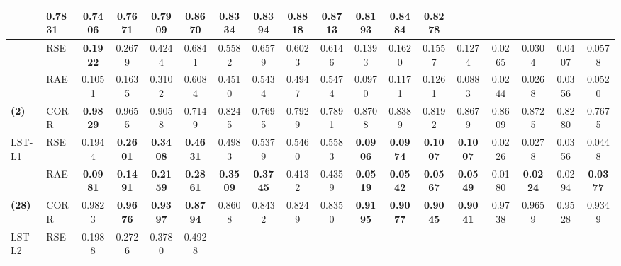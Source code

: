 \begin{table*}[!ht]
{\begin{tabular}{ll|cccc|cccc|cccc|cccc}
                          & 0.7831 & 0.7406 & 0.7671 & 0.7909
                          & 0.8670 & 0.8334 & 0.8394 & 0.8818
                          & 0.8713 & 0.8193 & 0.8484 & 0.8278\\
\midrule
{\multirow{2}{*}{VARMLP}} & RSE 
						 	   &\textbf{0.1922} & 0.2679 & 0.4244 & 0.6841 
                               & 0.5582 & 0.6579 & 0.6023 & 0.6146 
                               & 0.1393 & 0.1620 & 0.1557 & 0.1274
                               & 0.0265 & 0.0304 & 0.0407 & 0.0578\\
                     	& RAE  
                        	   & 0.1051 & 0.1635 & 0.3102 & 0.6084 
                               & 0.4510 & 0.5434 & 0.4947 & 0.5474
                               & 0.0970 & 0.1171 & 0.1261 & 0.0883
                               & 0.0244 & 0.0268 & 0.0356 & 0.0520 \\
\textbf{(2)}                   & CORR 
                        	   &\textbf{0.9829} & 0.9655 & 0.9058 & 0.7149 
                               & 0.8245 & 0.7695 & 0.7929 & 0.7891
                               & 0.8708 & 0.8389 & 0.8192 & 0.8679
                               & 0.8609 & 0.8725 & 0.8280 & 0.7675 \\
\midrule
\multirow{2}{*}{LST-L1}	& RSE 
							  & 0.1944 & \textbf{0.2601} & \textbf{0.3408} & \textbf{0.4631} 
                              & 0.4983 & 0.5379 & 0.5460 & 0.5583 
                              & \textbf{0.0906} & \textbf{0.0974} & \textbf{0.1007} & \textbf{0.1007} 
                              & 0.0226 & 0.0278 & 0.0356 &0.0448\\
						& RAE 
                              & \textbf{0.0981} & \textbf{0.1491} & \textbf{0.2159} & \textbf{0.2861} 
                              & \textbf{0.3509} & \textbf{0.3745} & 0.4132 & 0.4359
                              & \textbf{0.0519} & \textbf{0.0542} & \textbf{0.0567} & \textbf{0.0549} 
                              & 0.0180 & \textbf{0.0224} & 0.0294 &\textbf{0.0377}\\
\textbf{(28)}				  & CORR 
                       		  & 0.9823 & \textbf{0.9676} & \textbf{0.9397} & \textbf{0.8794}
                              & 0.8608 & 0.8432 & 0.8249 & 0.8350
                              & \textbf{0.9195} & \textbf{0.9077} & \textbf{0.9045} & \textbf{0.9041} 
                              & 0.9738 & 0.9659 & 0.9528 & 0.9349\\
\midrule                                                
\multirow{2}{*}{LST-L2}	& RSE 
							  & 0.1988 & 0.2726 & 0.3780 & 0.4928

\end{tabular}}
\end{table*}
